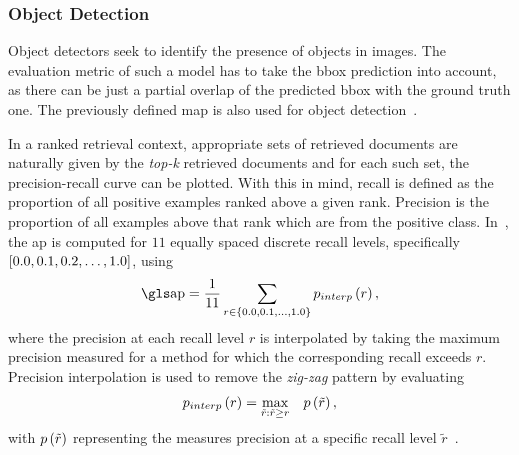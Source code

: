 \subsubsection{Object Detection}

Object detectors seek to identify the presence of objects in images. The evaluation metric of such a model has to take the \gls{bbox} prediction into account, as there can be just a partial overlap of the predicted \gls{bbox} with the ground truth one. The previously defined \gls{map} is also used for object detection~\cite{everingham2010pascalvoc}.

In a ranked retrieval context, appropriate sets of retrieved documents are naturally given by the \emph{top-k} retrieved documents and for each such set, the precision-recall curve can be plotted. With this in mind, recall is defined as the proportion of all positive examples ranked above a given rank. Precision is the proportion of all examples above that rank which are from the positive class. In~\cite{everingham2010pascalvoc}, the \gls{ap} is computed for $11$ equally spaced discrete recall levels, specifically $\left[ {0.0, 0.1, 0.2, \dots, 1.0} \right]$, using
\begin{equation}
    \AP = \frac{1}{11} \sum_{r \in \cbrackets{0.0, 0.1, \dots, 1.0}} \func{p_{interp}}{r},
\end{equation}
where the precision at each recall level $r$ is interpolated by taking the maximum precision measured for a method for which the corresponding recall exceeds $r$. Precision interpolation is used to remove the \emph{zig-zag} pattern by evaluating
\begin{equation}
    {p_{interp}} \left( r \right) = \underset{\tilde{r}:\tilde{r} \geq r}{\max} \quad {p} \left( \tilde{r} \right),
\end{equation}
with ${p} \left( \tilde{r} \right)$ representing the measures precision at a specific recall level $\tilde{r}$~\cite{salton1983introduction}.
